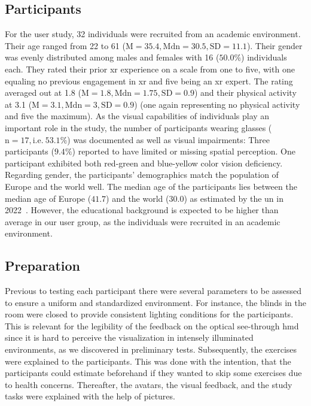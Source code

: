 \subsection{Participants}
For the user study, 32 individuals were recruited from an academic environment. Their age ranged from 22 to 61 (\(\mathrm{M} = 35.4, \mathrm{Mdn} = 30.5, \mathrm{SD} = 11.1\)). Their gender was evenly distributed among males and females with 16 (\(50.0\%\)) individuals each. They rated their prior \acrshort{xr} experience on a scale from one to five, with one equaling no previous engagement in \acrshort{xr} and five being an \acrshort{xr} expert. The rating averaged out at 1.8 (\(\mathrm{M}=1.8, \mathrm{Mdn} = 1.75, \mathrm{SD} = 0.9\)) and their physical activity at 3.1 (\(\mathrm{M}=3.1, \mathrm{Mdn} = 3, \mathrm{SD} = 0.9\)) (one again representing no physical activity and five the maximum). As the visual capabilities of individuals play an important role in the study, the number of participants wearing glasses (\(\mathrm{n} = 17, \mathrm{i.e.}~53.1\%\)) was documented as well as visual impairments: Three participants (\(9.4\%\)) reported to have limited or missing spatial perception. One participant exhibited both red-green and blue-yellow color vision deficiency. Regarding gender, the participants' demographics match the population of Europe and the world well. The median age of the participants lies between the median age of Europe (\(41.7\)) and the world (\(30.0\)) as estimated by the \acrshort{un} in 2022~\cite{united2022world}. However, the educational background is expected to be higher than average in our user group, as the individuals were recruited in an academic environment.

\subsection{Preparation}
Previous to testing each participant there were several parameters to be assessed to ensure a uniform and standardized environment. For instance, the blinds in the room were closed to provide consistent lighting conditions for the participants. This is relevant for the legibility of the feedback on the optical see-through \acrshort{hmd} since it is hard to perceive the visualization in intensely illuminated environments, as we discovered in preliminary tests. Subsequently, the exercises were explained to the participants. This was done with the intention, that the participants could estimate beforehand if they wanted to skip some exercises due to health concerns. Thereafter, the avatars, the visual feedback, and the study tasks were explained with the help of pictures.

